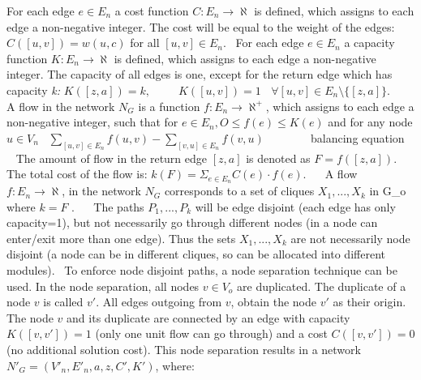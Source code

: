 For each edge $ e \in E_n $ a cost function $ C: E_n \rightarrow \aleph $ is defined, which assigns to each edge a non-\/negative integer. The cost will be equal to the weight of the edges\+: $ C([u,v])=w(u,c) $ for all $ [u,v] \in E_n $.~\newline
 For each edge $ e \in E_n $ a capacity function $ K:E_n \rightarrow \aleph $ is defined, which assigns to each edge a non-\/negative integer. The capacity of all edges is one, except for the return edge which has capacity {\itshape k\+:}  $ K([z,a])=k, \ \ \ \ \ \ \ \ \ \ \ K([u,v])=1 \ \ \ \ \forall [u,v] \in E_n \setminus \lbrace [z,a] \rbrace $.~\newline
~\newline
 A flow in the network $ N_G $ is a function $ f:E_n \rightarrow \aleph ^{+} $, which assigns to each edge a non-\/negative integer, such that for $ e \in E_n,O \leq f(e) \leq K(e) $ and for any node $ u \in V_n $~\newline
 $ \sum _{[u,v]\in E_n} f(u,v) - \sum _{[v,u]\in E_n} f(v,u) \ \ \ \ \ \ \ \ \ \ \ \ \ \ \ \ \ $ balancing equation ~\newline
~\newline
 The amount of flow in the return edge $ [z,a] $ is denoted as $ F=f([z,a]) $. The total cost of the flow is\+: $ k(F)=\Sigma _{e\in E_n} C(e) \cdot f(e) $.~\newline
~\newline
 A flow $ f:E_n \rightarrow \aleph $, in the network $ N_G $ corresponds to a set of cliques $ X_1,...,X_k $ in G\+\_\+o where $ k=F $ .~\newline
~\newline
 The paths $ P_1,...,P_k $ will be edge disjoint (each edge has only capacity=1), but not necessarily go through different nodes (in a node can enter/exit more than one edge). Thus the sets $ X_1,...,X_k $ are not necessarily node disjoint (a node can be in different cliques, so can be allocated into different modules).~\newline
 To enforce node disjoint paths, a node separation technique can be used. In the node separation, all nodes $ v \in V_o $ are duplicated. The duplicate of a node $ v $ is called $ v' $. All edges outgoing from $ v $, obtain the node $ v' $ as their origin. The node $ v $ and its duplicate are connected by an edge with capacity $ K([v,v'])=1 $ (only one unit flow can go through) and a cost $ C([v,v'])=0 $ (no additional solution cost). This node separation results in a network $ N'_G=(V'_n,E'_n,a,z,C',K') $, where\+:~\newline

